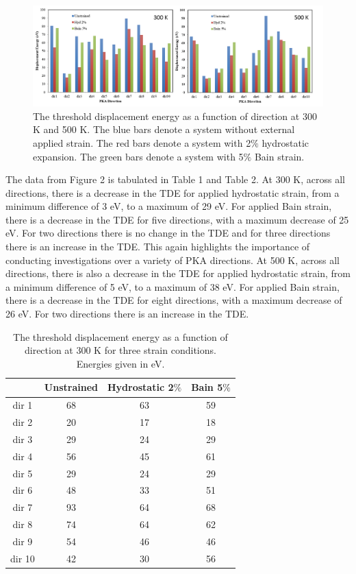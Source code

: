 \documentclass[review]{elsarticle}
\begin{document}
\begin{figure}[hp]
   \centering
   \includegraphics[width=\textwidth]{bar_charts.png} %
   \caption{The threshold displacement energy as a function of direction at 300 K and 500 K.  The blue bars denote a system without external applied strain.  The red bars denote a system with 2$\%$ hydrostatic expansion. The green bars denote a system with 5$\%$ Bain strain.}
   \label{fig:example}
\end{figure}

The data from Figure 2 is tabulated in Table 1 and Table 2.  At 300 K, across all directions, there is a decrease in the TDE for applied hydrostatic strain, from a minimum difference of 3 eV, to a maximum of 29 eV.  For applied Bain strain, there is a decrease in the TDE for five directions, with a maximum decrease of 25 eV.  For two directions there is no change in the TDE and for three directions there is an increase in the TDE.  This again highlights the importance of conducting investigations over a variety of PKA directions.  At 500 K, across all directions, there is also a decrease in the TDE for applied hydrostatic strain, from a minimum difference of 5 eV, to a maximum of 38 eV.  For applied Bain strain, there is a decrease in the TDE for eight directions, with a maximum decrease of 26 eV.  For two directions there is an increase in the TDE.  

\begin{table}[htbp]
\caption{The threshold displacement energy as a function of direction at 300 K for three strain conditions.  Energies given in eV.}
\begin{center}
\begin{tabular}{|c|c|c|c|}
	\hline
	& Unstrained & Hydrostatic 2$\%$ & Bain 5$\%$ \\
	 \hline
	 dir 1 & 68 & 63 & 59 \\
	 dir 2 & 20 & 17 & 18 \\
	 dir 3 & 29 & 24 & 29 \\
	 dir 4 & 56 & 45 & 61 \\
	 dir 5 & 29 & 24 & 29 \\
	 dir 6 & 48 & 33 & 51 \\
	 dir 7 & 93 & 64 & 68 \\
	 dir 8 & 74 & 64 & 62 \\
	 dir 9 & 54 & 46 & 46 \\
	 dir 10 & 42 & 30 & 56 \\
	 \hline
\end{tabular}
\end{center}
\label{default}
\end{table}%
\end{document}
